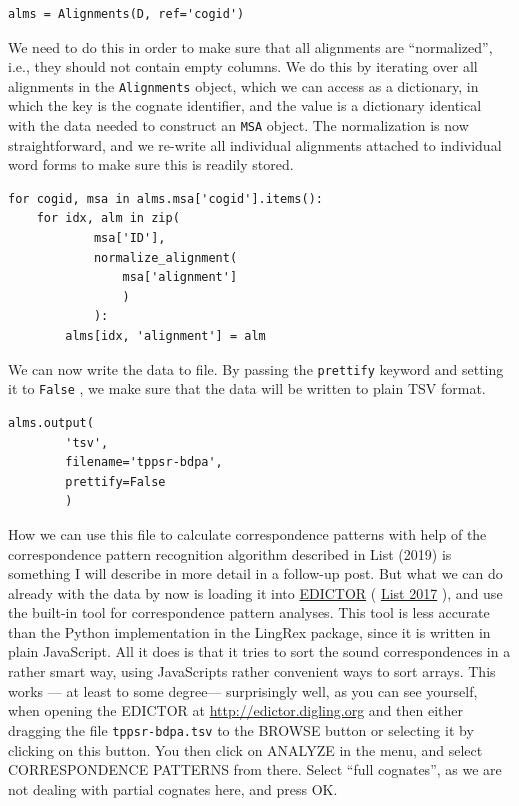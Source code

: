 \documentclass[
  a4paper,
  14pt,
  oneside,
  tablecaptionabove
]{scrbook}
\newcommand{\passthrough}[1]{#1}
\begin{document}
\begin{lstlisting}
alms = Alignments(D, ref='cogid')
\end{lstlisting}

We need to do this in order to make sure that all alignments are
\enquote{normalized}, i.e., they should not contain empty columns. We do
this by iterating over all alignments in the
\passthrough{\lstinline!Alignments!} object, which we can access as a
dictionary, in which the key is the cognate identifier, and the value is
a dictionary identical with the data needed to construct an
\passthrough{\lstinline!MSA!} object. The normalization is now
straightforward, and we re-write all individual alignments attached to
individual word forms to make sure this is readily stored.

\begin{lstlisting}
for cogid, msa in alms.msa['cogid'].items():
    for idx, alm in zip(
            msa['ID'],
            normalize_alignment(
                msa['alignment']
                )
            ):
        alms[idx, 'alignment'] = alm
\end{lstlisting}

We can now write the data to file. By passing the
\passthrough{\lstinline!prettify!} keyword and setting it to
\passthrough{\lstinline!False!} , we make sure that the data will be
written to plain TSV format.

\begin{lstlisting}
alms.output(
        'tsv',
        filename='tppsr-bdpa',
        prettify=False
        )
\end{lstlisting}

How we can use this file to calculate correspondence patterns with help
of the correspondence pattern recognition algorithm described in List
(2019) is something I will describe in more detail in a follow-up post.
But what we can do already with the data by now is loading it into
\href{http://edictor.digling.org}{EDICTOR} (
\href{http://bibliography.lingpy.org?key=List2017d}{List 2017} ), and
use the built-in tool for correspondence pattern analyses. This tool is
less accurate than the Python implementation in the LingRex package,
since it is written in plain JavaScript. All it does is that it tries to
sort the sound correspondences in a rather smart way, using JavaScripts
rather convenient ways to sort arrays. This works --- at least to some
degree--- surprisingly well, as you can see yourself, when opening the
EDICTOR at \url{http://edictor.digling.org} and then either dragging the
file \passthrough{\lstinline!tppsr-bdpa.tsv!} to the BROWSE button or
selecting it by clicking on this button. You then click on ANALYZE in
the menu, and select CORRESPONDENCE PATTERNS from there. Select
\enquote{full cognates}, as we are not dealing with partial cognates
here, and press OK.
\end{document}
